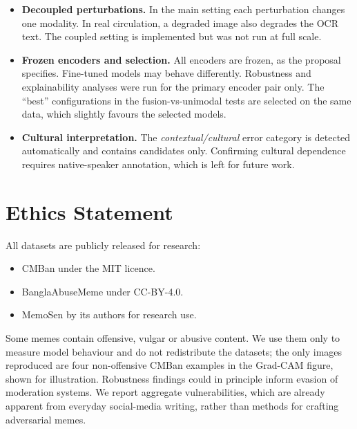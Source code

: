 \begin{itemize}
  \item \textbf{Decoupled perturbations.} In the main setting each perturbation changes one modality. In real
  circulation, a degraded image also degrades the OCR text. The coupled setting is implemented but was not run at
  full scale.

  \item \textbf{Frozen encoders and selection.} All encoders are frozen, as the proposal specifies. Fine-tuned
  models may behave differently. Robustness and explainability analyses were run for the primary encoder pair only.
  The ``best'' configurations in the fusion-vs-unimodal tests are selected on the same data, which slightly favours
  the selected models.

  \item \textbf{Cultural interpretation.} The \emph{contextual/cultural} error category is detected automatically
  and contains candidates only. Confirming cultural dependence requires native-speaker annotation, which is left
  for future work.
\end{itemize}

\section*{Ethics Statement}
All datasets are publicly released for research:
\begin{itemize}
  \item CMBan under the MIT licence.
  \item BanglaAbuseMeme under CC-BY-4.0.
  \item MemoSen by its authors for research use.
\end{itemize}
Some memes contain offensive, vulgar or abusive content. We use them only to measure model behaviour and do not
redistribute the datasets; the only images reproduced are four non-offensive CMBan examples in the Grad-CAM figure,
shown for illustration. Robustness findings could in principle inform evasion of moderation systems. We report
aggregate vulnerabilities, which are already apparent from everyday social-media writing, rather than methods for
crafting adversarial memes.
